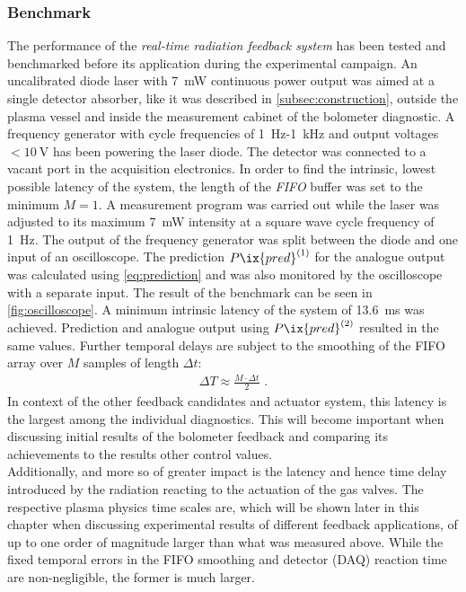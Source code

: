             \subsubsection{Benchmark}\label{sec:benchmark}%
%
                The performance of the \textit{real-time radiation feedback system} has been tested and benchmarked before its application during the experimental campaign. An uncalibrated diode laser with \SI{7}{\milli\watt} continuous power output was aimed at a single detector absorber, like it was described in \cref{subsec:construction}, outside the plasma vessel and inside the measurement cabinet of the bolometer diagnostic. A frequency generator with cycle frequencies of \SI{1}{\hertz}-\SI{1}{\kilo\hertz} and output voltages $<\SI{10}{\volt}$ has been powering the laser diode. The detector was connected to a vacant port in the acquisition electronics. In order to find the intrinsic, lowest possible latency of the system, the length of the \textit{FIFO} buffer was set to the minimum $M=1$. A measurement program was carried out while the laser was adjusted to its maximum \SI{7}{\milli\watt} intensity at a square wave cycle frequency of \SI{1}{\hertz}. The output of the frequency generator was split between the diode and one input of an oscilloscope. The prediction $P\ix{pred}^{\left(1\right)}$ for the analogue output was calculated using \cref{eq:prediction} and was also monitored by the oscilloscope with a separate input. The result of the benchmark can be seen in \cref{fig:oscilloscope}. A minimum intrinsic latency of the system of \SI{13.6}{\milli\second} was achieved. Prediction and analogue output using $P\ix{pred}^{\left(2\right)}$ resulted in the same values. Further temporal delays are subject to the smoothing of the FIFO array over $M$ samples of length $\Delta t$:%
%
                \begin{align*}%
                    \Delta T\approx\frac{M\cdot\Delta t}{2}\,\,.%
                \end{align*}%
%
                In context of the other feedback candidates and actuator system, this latency is the largest among the individual diagnostics. This will become important when discussing initial results of the bolometer feedback and comparing its achievements to the results other control values.\\%
                Additionally, and more so of greater impact is the latency and hence time delay introduced by the radiation reacting to the actuation of the gas valves. The respective plasma physics time scales are, which will be shown later in this chapter when discussing experimental results of different feedback applications, of up to one order of magnitude larger than what was measured above. While the fixed temporal errors in the FIFO smoothing and detector (DAQ) reaction time are non-negligible, the former is much larger.%
